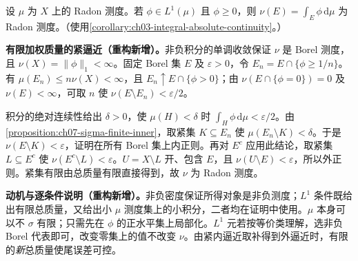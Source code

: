 \documentclass[../../main.tex]{subfiles}
\begin{document}
\begin{exercise}\label{exercise:ch07-integrable-weight-radon}
设 $\mu$ 为 $X$ 上的 Radon 测度。若 $\phi\in L^1(\mu)$ 且 $\phi\geqslant0$，则 $\nu(E)=\int_E\phi\,\mathrm d\mu$ 为 Radon 测度。（使用\cref{corollary:ch03-integral-absolute-continuity}。）
\end{exercise}
\begin{solution}
\textbf{有限加权质量的紧逼近（重构新增）。}非负积分的单调收敛保证 $\nu$ 是 Borel 测度，且 $\nu(X)=\|\phi\|_1<\infty$。固定 Borel 集 $E$ 及 $\varepsilon>0$，令 $E_n=E\cap\{\phi\geqslant1/n\}$。有 $\mu(E_n)\leqslant n\nu(X)<\infty$，且 $E_n\uparrow E\cap\{\phi>0\}$；由 $\nu(E\cap\{\phi=0\})=0$ 及 $\nu(E)<\infty$，可取 $n$ 使 $\nu(E\setminus E_n)<\varepsilon/2$。

积分的绝对连续性给出 $\delta>0$，使 $\mu(H)<\delta$ 时 $\int_H\phi\,\mathrm d\mu<\varepsilon/2$。由\cref{proposition:ch07-sigma-finite-inner}，取紧集 $K\subseteq E_n$ 使 $\mu(E_n\setminus K)<\delta$。于是 $\nu(E\setminus K)<\varepsilon$，证明在所有 Borel 集上内正则。再对 $E^c$ 应用此结论，取紧集 $L\subseteq E^c$ 使 $\nu(E^c\setminus L)<\varepsilon$。$U=X\setminus L$ 开、包含 $E$，且 $\nu(U\setminus E)<\varepsilon$，所以外正则。紧集有限由总质量有限直接得到，故 $\nu$ 为 Radon 测度。
\end{solution}
\begin{remark}
\textbf{动机与逐条件说明（重构新增）。}非负密度保证所得对象是非负测度；$L^1$ 条件既给出有限总质量，又给出小 $\mu$ 测度集上的小积分，二者均在证明中使用。$\mu$ 本身可以不 $\sigma$ 有限；只需先在 $\phi$ 的正水平集上局部化。$L^1$ 元若按等价类理解，选非负 Borel 代表即可，改变零集上的值不改变 $\nu$。由紧内逼近取补得到外逼近时，有限的\emph{新}总质量使尾误差可控。
\end{remark}
\end{document}
